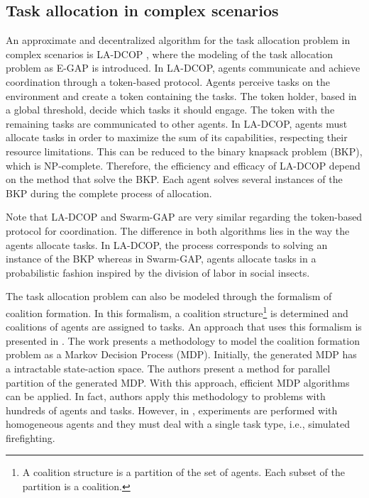 \documentclass[a4paper]{sbgames}
\begin{document}
\subsection{Task allocation in complex scenarios}
\label{sec:related_ta}

An approximate and decentralized algorithm for the task allocation problem in complex scenarios is LA-DCOP \cite{Scerri+2005}, where the modeling of the task allocation problem as E-GAP is introduced. In LA-DCOP, agents communicate and achieve coordination through a token-based protocol. Agents perceive tasks on the environment and create a token containing the tasks. The token holder, based in a global threshold, decide which tasks it should engage. The token with the remaining tasks are communicated to other agents. In LA-DCOP, agents must allocate tasks in order to maximize the sum of its capabilities, respecting their resource limitations. This can be reduced to the binary knapsack problem (BKP), which is NP-complete. Therefore, the efficiency and efficacy of LA-DCOP depend on the method that solve the BKP. Each agent solves several instances of the BKP during the complete process of allocation.

Note that LA-DCOP and Swarm-GAP are very similar regarding the token-based protocol for coordination. The difference in both algorithms lies in the way the agents allocate tasks. In LA-DCOP, the process corresponds to solving an instance of the BKP whereas in Swarm-GAP, agents allocate tasks in a probabilistic fashion inspired by the division of labor in social insects.

The task allocation problem can also be modeled through the formalism of coalition formation. In this formalism, a coalition structure\footnote{A coalition structure is a partition of the set of agents. Each subset of the partition is a coalition.} is determined and coalitions of agents are assigned to tasks. An approach that uses this formalism is presented in \cite{Khan+2010}. The work presents a methodology to model the coalition formation problem as a Markov Decision Process (MDP). Initially, the generated MDP has a intractable state-action space. The authors present a method for parallel partition of the generated MDP. With this approach, efficient MDP algorithms can be applied. In fact, authors apply this methodology to problems with hundreds of agents and tasks. However, in \cite{Khan+2010}, experiments are performed with homogeneous agents and they must deal with a single task type, i.e., simulated firefighting.
\end{document}
